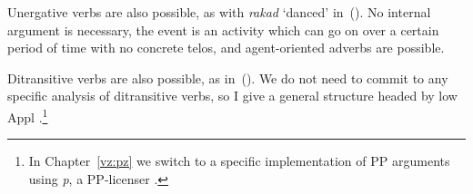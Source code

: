 \begin{exe}
\begin{xlist}
\begin{exe}
\begin{xlist}
\begin{exe}
\begin{xlist}
\begin{exe}
\begin{exe}
\begin{xlist}
\begin{exe}
\begin{xlist}
\begin{exe}
\begin{xlist}
\begin{exe}
\begin{xlist}
\begin{exe}
\begin{xlist}
\begin{exe}
\begin{xlist}
\begin{exe}
\begin{xlist}
\begin{exe}
\begin{xlist}
\begin{exe}
\begin{xlist}
\begin{exe}
\begin{xlist}
\begin{exe}
\begin{xlist}
\begin{exe}
\begin{xlist}
\begin{exe}
\begin{exe}
\begin{xlist}
Unergative verbs are also possible, as with \emph{rakad} `danced' in~(\nextx). No internal argument is necessary, the event is an activity which can go on over a certain period of time with no concrete telos, and agent-oriented adverbs are possible.
 \begin{exe}
 \ex \label{ex:voice-intro-unerg2} 
 \begin{xlist} 
	
 	 \z
\z 

Ditransitive verbs are also possible, as in~(\nextx). We do not need to commit to any specific analysis of ditransitive verbs, so I give a general structure headed by low Appl \citep[18]{pylkkanen08}.\footnote{In Chapter~\ref{vz:pz} we switch to a specific implementation of PP arguments using \emph{p}, a PP-licenser \citep{koopman97,svenonius03,gehrke08phd,wood15springer}.}
 \begin{exe}
 \ex \label{ex:voice-intro-ditr2} 
 \begin{xlist} 
	
 	 \z
\z 


\end{xlist}
\end{exe}
\end{xlist}
\end{exe}
\end{xlist}
\end{exe}
\end{exe}
\end{xlist}
\end{exe}
\end{xlist}
\end{exe}
\end{xlist}
\end{exe}
\end{xlist}
\end{exe}
\end{xlist}
\end{exe}
\end{xlist}
\end{exe}
\end{xlist}
\end{exe}
\end{xlist}
\end{exe}
\end{xlist}
\end{exe}
\end{xlist}
\end{exe}
\end{xlist}
\end{exe}
\end{xlist}
\end{exe}
\end{exe}
\end{xlist}
\end{exe}
\end{xlist}
\end{exe}
\end{xlist}
\end{exe}
